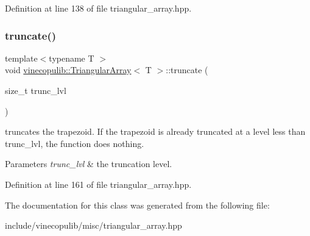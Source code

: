 Definition at line 138 of file triangular\+\_\+array.\+hpp.

\mbox{\label{classvinecopulib_1_1_triangular_array_ab6d8130336a957271b1db9018781e69a}} 
\subsubsection{\texorpdfstring{truncate()}{truncate()}}
{\footnotesize\ttfamily template$<$typename T $>$ \\
void \hyperlink{classvinecopulib_1_1_triangular_array}{vinecopulib\+::\+Triangular\+Array}$<$ T $>$\+::truncate (\begin{DoxyParamCaption}\item[{size\+\_\+t}]{trunc\+\_\+lvl }\end{DoxyParamCaption})}



truncates the trapezoid. If the trapezoid is already truncated at a level less than {\ttfamily trunc\+\_\+lvl}, the function does nothing. 


\begin{DoxyParams}{Parameters}
{\em trunc\+\_\+lvl} & the truncation level. \\
\hline
\end{DoxyParams}


Definition at line 161 of file triangular\+\_\+array.\+hpp.



The documentation for this class was generated from the following file\+:\begin{DoxyCompactItemize}
\item 
include/vinecopulib/misc/triangular\+\_\+array.\+hpp\end{DoxyCompactItemize}
